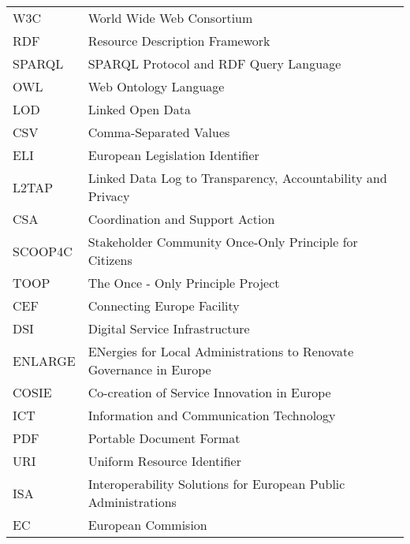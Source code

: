 \documentclass[inscr,ack]{dithesis}
\begin{document}
\frontmatter

\mainmatter



\backmatter

\abbreviations
\begin{center}
	\renewcommand{\arraystretch}{1.5}
	\begin{longtable}{ l @{\qquad} l }
	\toprule
  W3C    & World Wide Web Consortium \\
	RDF    & Resource Description Framework \\
	SPARQL & SPARQL Protocol and RDF Query Language \\
	OWL    & Web Ontology Language \\
  LOD    & Linked Open Data \\
  CSV    & Comma-Separated Values \\
  ELI    & European Legislation Identifier \\
  L2TAP  & Linked Data Log to Transparency, Accountability and Privacy \\
  CSA    & Coordination and Support Action \\
  SCOOP4C & Stakeholder Community Once-Only Principle for Citizens \\
  TOOP   & The Once - Only Principle Project \\
  CEF    & Connecting Europe Facility \\
  DSI    & Digital Service Infrastructure \\
  ENLARGE & ENergies for Local Administrations to Renovate Governance in Europe \\
  COSIE  & Co-creation of Service Innovation in Europe \\
  ICT    & Information and Communication Technology\\
  PDF    & Portable Document Format \\
  URI    & Uniform Resource Identifier \\
  ISA    & Interoperability Solutions for European Public Administrations \\
  EC     & European Commision \\
	\bottomrule
	\end{longtable}
\end{center}



\end{document}
